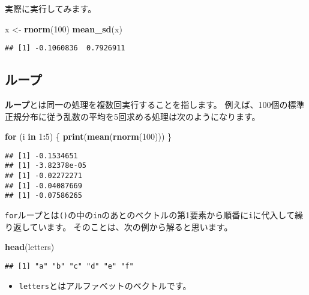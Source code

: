 \documentclass[]{bxjsarticle}
\newenvironment{Shaded}{\begin{snugshade}}{\end{snugshade}}
\newcommand{\ControlFlowTok}[1]{\textcolor[rgb]{0.13,0.29,0.53}{\textbf{#1}}}
\newcommand{\DecValTok}[1]{\textcolor[rgb]{0.00,0.00,0.81}{#1}}
\newcommand{\KeywordTok}[1]{\textcolor[rgb]{0.13,0.29,0.53}{\textbf{#1}}}
\newcommand{\NormalTok}[1]{#1}
\newcommand{\OperatorTok}[1]{\textcolor[rgb]{0.81,0.36,0.00}{\textbf{#1}}}
\newcommand{\StringTok}[1]{\textcolor[rgb]{0.31,0.60,0.02}{#1}}
\providecommand{\tightlist}{%
  \setlength{\itemsep}{0pt}\setlength{\parskip}{0pt}}
\begin{document}
実際に実行してみます。

\begin{Shaded}
\begin{Highlighting}[]
\NormalTok{x <-}\StringTok{ }\KeywordTok{rnorm}\NormalTok{(}\DecValTok{100}\NormalTok{)}
\KeywordTok{mean_sd}\NormalTok{(x)}
\end{Highlighting}
\end{Shaded}

\begin{verbatim}
## [1] -0.1060836  0.7926911
\end{verbatim}

\hypertarget{ux30ebux30fcux30d7}{%
\subsection{ループ}\label{ux30ebux30fcux30d7}}

\textbf{ループ}とは同一の処理を複数回実行することを指します。
例えば、100個の標準正規分布に従う乱数の平均を5回求める処理は次のようになります。

\begin{Shaded}
\begin{Highlighting}[]
\ControlFlowTok{for}\NormalTok{ (i }\ControlFlowTok{in} \DecValTok{1}\OperatorTok{:}\DecValTok{5}\NormalTok{) \{}
  \KeywordTok{print}\NormalTok{(}\KeywordTok{mean}\NormalTok{(}\KeywordTok{rnorm}\NormalTok{(}\DecValTok{100}\NormalTok{)))}
\NormalTok{\}}
\end{Highlighting}
\end{Shaded}

\begin{verbatim}
## [1] -0.1534651
## [1] -3.82378e-05
## [1] -0.02272271
## [1] -0.04087669
## [1] -0.07586265
\end{verbatim}

\texttt{for}ループとは\texttt{()}の中の\texttt{in}のあとのベクトルの第1要素から順番に\texttt{i}に代入して繰り返しています。
そのことは、次の例から解ると思います。

\begin{Shaded}
\begin{Highlighting}[]
\KeywordTok{head}\NormalTok{(letters)}
\end{Highlighting}
\end{Shaded}

\begin{verbatim}
## [1] "a" "b" "c" "d" "e" "f"
\end{verbatim}

\begin{itemize}
\tightlist
\item
  \texttt{letters}とはアルファベットのベクトルです。
\end{itemize}
\end{document}
